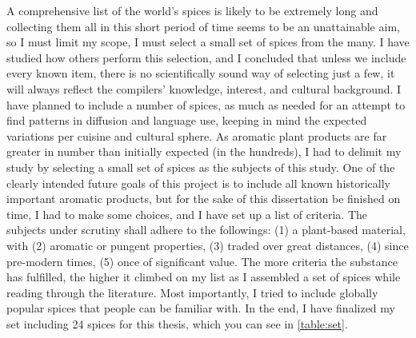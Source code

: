 
A comprehensive list of the world's spices is likely to be extremely long and collecting them all in this short period of time seems to be an unattainable aim, so I must limit my scope, I must select a small set of spices from the many. I have studied how others perform this selection, and I concluded that unless we include every known item, there is no scientifically sound way of selecting just a few, it will always reflect the compilers' knowledge, interest, and cultural background. I have planned to include a number of spices, as much as needed for an attempt to find patterns in diffusion and language use, keeping in mind the expected variations per cuisine and cultural sphere. As aromatic plant products are far greater in number than initially expected (in the hundreds), I had to delimit my study by selecting a small set of spices as the subjects of this study. One of the clearly intended future goals of this project is to include all known historically important aromatic products, but for the sake of this dissertation be finished on time, I had to make some choices, and I have set up a list of criteria. The subjects under scrutiny shall adhere to the followings: (1) a plant-based material, with (2) aromatic or pungent properties, (3) traded over great distances, (4) since pre-modern times, (5) once of significant value. The more criteria the substance has fulfilled, the higher it climbed on my list as I assembled a set of spices while reading through the literature. Most importantly, I tried to include globally popular spices that people can be familiar with. In the end, I have finalized my set including 24 spices for this thesis, which you can see in \cref{table:set}. 



\setlength{\tabcolsep}{3pt}

